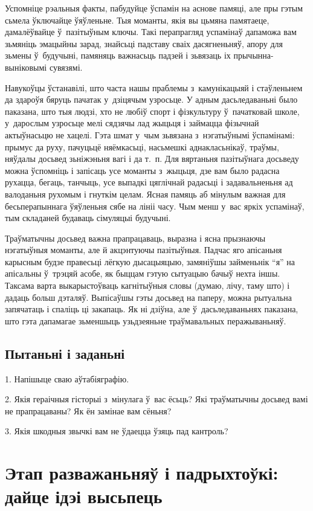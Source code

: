 Успомніце рэальныя факты, пабудуйце ўспамін на аснове памяці, але пры гэтым сьмела ўключайце ўяўленьне. Тыя моманты, якія вы цьмяна памятаеце, дамалёўвайце ў~пазітыўным ключы. Такі перапрагляд успамінаў дапаможа вам зьмяніць эмацыйны зарад, знайсьці падставу сваіх дасягненьняў, апору для зьмены ў~будучыні, памяняць важнасьць падзей і зьвязаць іх прычынна-выніковымі сувязямі.

Навукоўцы ўстанавілі, што часта нашы праблемы з~камунікацыяй і стаўленьнем да здароўя бяруць пачатак у~дзіцячым узросьце. У адным дасьледаваньні было паказана, што тыя людзі, хто не любіў спорт і фізкультуру ў~пачатковай школе, у~дарослым узросьце мелі сядзячы лад жыцьця і займацца фізычнай актыўнасьцю не хацелі. Гэта шмат у~чым зьвязана з~нэгатыўнымі ўспамінамі: прымус да руху, пачуцьцё няёмкасьці, насьмешкі аднакласьнікаў, траўмы, няўдалы досьвед зьніжэньня вагі і да т.~п. Для вяртаньня пазітыўнага досьведу можна ўспомніць і запісаць усе моманты з~жыцьця, дзе вам было радасна рухацца, бегаць, танчыць, усе выпадкі цяглічнай радасьці і задавальненьня ад валоданьня рухомым і гнуткім целам. Ясная памяць аб мінулым важная для бесьперапыннага ўяўленьня сябе на лініі часу. Чым менш у~вас яркіх успамінаў, тым складаней будаваць сімуляцыі будучыні.

Траўматычны досьвед важна прапрацаваць, выразна і ясна прызнаючы нэгатыўныя моманты, але й акцэнтуючы пазітыўныя. Падчас яго апісаньня карысным будзе правесьці лёгкую дысацыяцыю, замяніўшы займеньнік ``я'' на апісальны ў~трэцяй асобе, як быццам гэтую сытуацыю бачыў нехта іншы. Таксама варта выкарыстоўваць кагнітыўныя словы (думаю, лічу, таму што) і дадаць больш дэталяў. Выпісаўшы гэты досьвед на паперу, можна рытуальна запячатаць і спаліць ці закапаць. Як ні дзіўна, але ў~дасьледаваньнях паказана, што гэта дапамагае зьменшыць узьдзеяньне траўмавальных перажываньняў.

\subsection*{Пытаньні і заданьні}

1. Напішыце сваю аўтабіяграфію.

2. Якія гераічныя гісторыі з~мінулага ў~вас ёсьць? Які траўматычны досьвед вамі не прапрацаваны? Як ён замінае вам сёньня?

3. Якія шкодныя звычкі вам не ўдаецца ўзяць пад кантроль?


\section{Этап разважаньняў і падрыхтоўкі: дайце ідэі высьпець}

